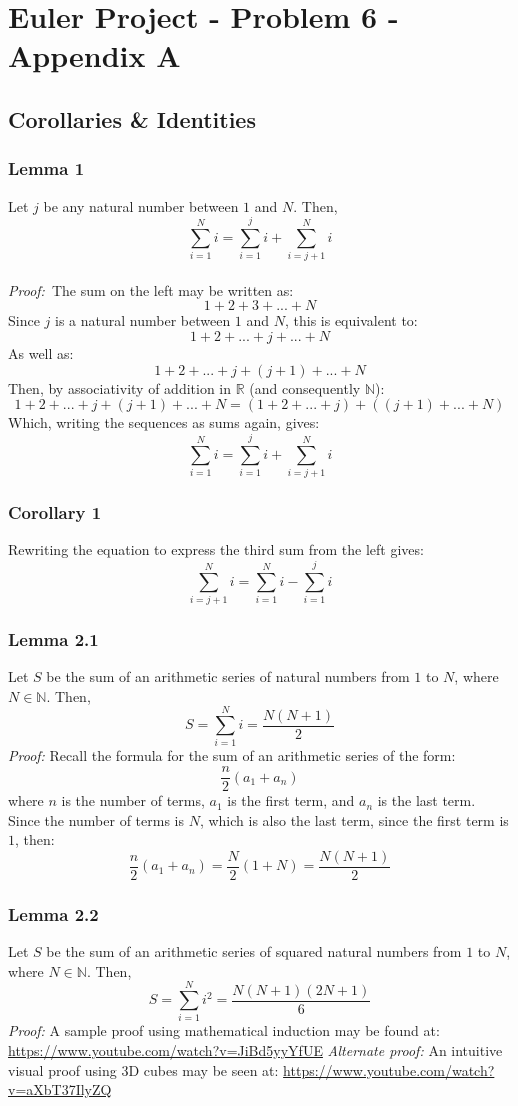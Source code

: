 \documentclass[]{article}
\begin{document}
\allowdisplaybreaks
\raggedbottom
\section*{Euler Project - Problem 6 - Appendix A}
\subsection*{Corollaries \& Identities}
\subsubsection*{Lemma 1}
Let $j$ be any natural number between $1$ and $N$. Then,
\[\sum_{i=1}^{N}i=\sum_{i=1}^{j}i + \sum_{i=j+1}^{N}i\]\\
\textit{Proof:}\
The sum on the left may be written as:
\[1 + 2 + 3 + ... + N\]
Since $j$ is a natural number between $1$ and $N$, this is equivalent to: 
\[1 + 2 + ... + j + ... + N\]
As well as:
\[1 + 2 + ... + j + (j+1) + ... + N\]
Then, by associativity of addition in $\mathbb{R}$ (and consequently $\mathbb{N}$):
\[1 + 2 + ... + j + (j+1) + ... + N = (1 + 2 + ... + j) + ((j+1) + ... + N)\]
Which, writing the sequences as sums again, gives:
\[\sum_{i=1}^{N}i=\sum_{i=1}^{j}i + \sum_{i=j+1}^{N}i\]

\subsubsection*{Corollary 1}
Rewriting the equation to express the third sum from the left gives:
\[\sum_{i=j+1}^{N}i=\sum_{i=1}^{N}i-\sum_{i=1}^{j}i\]

\subsubsection*{Lemma 2.1}
Let $S$ be the sum of an arithmetic series of natural numbers from $1$ to $N$, where $N \in \mathbb{N}$. Then,
\[S=\sum_{i=1}^{N}i=\frac{N(N+1)}{2}\]
\textit{Proof:} Recall the formula for the sum of an arithmetic series of the form:
\[\frac{n}{2}(a_1 + a_n)\]
where $n$ is the number of terms, $a_1$ is the first term, and $a_n$ is the last term.\\
Since the number of terms is $N$, which is also the last term, since the first term is $1$, then:
\[\frac{n}{2}(a_1 + a_n) = \frac{N}{2}(1 + N) = \frac{N(N+1)}{2}\]

\subsubsection*{Lemma 2.2}
Let $S$ be the sum of an arithmetic series of squared natural numbers from $1$ to $N$, where $N \in \mathbb{N}$. Then,
\[S=\sum_{i=1}^{N}i^2=\frac{N(N+1)(2N+1)}{6}\]
\textit{Proof:} A sample proof using mathematical induction may be found at: \url{https://www.youtube.com/watch?v=JiBd5yyYfUE}
\textit{Alternate proof:} An intuitive visual proof using 3D cubes may be seen at: \url{https://www.youtube.com/watch?v=aXbT37IlyZQ}
\end{document}

